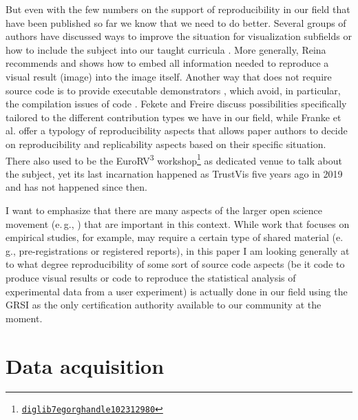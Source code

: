 \documentclass[conference]{vgtc}                     %
\newcommand{\eg}{e.\,g.}
\begin{document}
But even with the few numbers on the support of reproducibility in our field that have been published so far we know that we need to do better. Several groups of authors have discussed ways to improve the situation for visualization subfields \cite{Chopra:2023:PGG,Cushing:2018:SVR,Sukumar:2018:TDU,Valdez:2018:RRR} or how to include the subject into our taught curricula \cite{Syeda:2024:VRT}. More generally, Reina \cite{Reina:2023:CID} recommends and shows how to embed all information needed to reproduce a visual result (image) into the image itself. Another way that does not require source code is to provide executable demonstrators \cite{Bonneel:2020:CRC,Isenberg:2022:PEP}, which avoid, in particular, the compilation issues of code \cite{Bonneel:2020:CRC}. Fekete and Freire \cite{Fekete:2020:ERV} discuss possibilities specifically tailored to the different contribution types we have in our field, while Franke et al. \cite{Franke:2023:TRV} offer a typology of reproducibility aspects that allows paper authors to decide on reproducibility and replicability aspects based on their specific situation. There also used to be the EuroRV\textsuperscript{3} workshop\footnote{\href{https://diglib7.eg.org/handle/10.2312/980}{\texttt{diglib7egorg\discretionary{/}{}{/}handle\discretionary{/}{}{/}102312\discretionary{/}{}{/}980}}} as dedicated venue to talk about the subject, yet its last incarnation happened as TrustVis five years ago in 2019 and has not happened since then.

I want to emphasize that there are many aspects of the larger open science movement (\eg, \cite{Jansen:2024:MWB}) that are important in this context. While work that focuses on empirical studies, for example, may require a certain type of shared material \cite{Kosara:2018:SRC} (\eg, pre-registrations or registered reports), in this paper I am looking generally at to what degree reproducibility of some sort of source code aspects (be it code to produce visual results or code to reproduce the statistical analysis of experimental data from a user experiment) is actually done in our field using the GRSI as the only certification authority available to our community at the moment.

\section{Data acquisition}
\label{sec:data}
\end{document}
